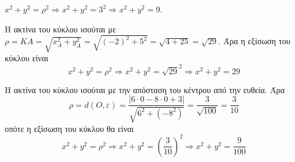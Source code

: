 \begin{alist}
\item $ x^2+y^2=\rho^2\Rightarrow x^2+y^2=3^2\Rightarrow x^2+y^2=9 $.
\item Η ακτίνα του κύκλου ισούται με $ \rho=KA=\sqrt{x_A^2+y_A^2}=\sqrt{(-2)^2+5^2}=\sqrt{4+25}=\sqrt{29} $. Άρα η εξίσωση του κύκλου είναι
\[ x^2+y^2=\rho^2\Rightarrow x^2+y^2=\sqrt{29}^2\Rightarrow x^2+y^2=29 \]
\item Η ακτίνα του κύκλου ισούται με την απόσταση του κέντρου από την ευθεία. Άρα
\[ \rho=d(O,\varepsilon)=\frac{|6\cdot 0-8\cdot 0+3|}{\sqrt{6^2+(-8^2)}}=\frac{3}{\sqrt{100}}=\frac{3}{10} \]
οπότε η εξίσωση του κύκλου θα είναι
\[ x^2+y^2=\rho^2\Rightarrow x^2+y^2=\left(\frac{3}{10}\right)^2\Rightarrow x^2+y^2=\frac{9}{100} \]
\end{alist}
